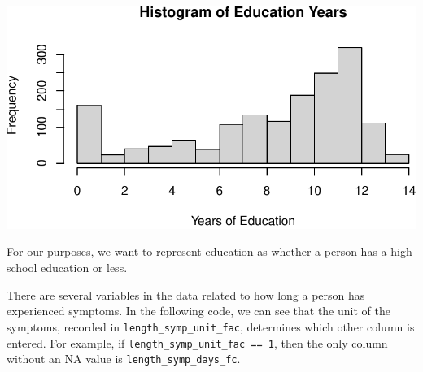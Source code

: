 \documentclass[
  letterpaper,
]{latex/krantz}
\makeatletter
\newenvironment{Shaded}{\begin{snugshade}}{\end{snugshade}}
\newcommand{\CommentTok}[1]{\textcolor[rgb]{0.37,0.37,0.37}{#1}}
\newcommand{\ConstantTok}[1]{\textcolor[rgb]{0.56,0.35,0.01}{#1}}
\newcommand{\DecValTok}[1]{\textcolor[rgb]{0.68,0.00,0.00}{#1}}
\newcommand{\FunctionTok}[1]{\textcolor[rgb]{0.28,0.35,0.67}{#1}}
\newcommand{\NormalTok}[1]{\textcolor[rgb]{0.00,0.23,0.31}{#1}}
\newcommand{\OtherTok}[1]{\textcolor[rgb]{0.00,0.23,0.31}{#1}}
\newcommand{\SpecialCharTok}[1]{\textcolor[rgb]{0.37,0.37,0.37}{#1}}
\newenvironment{kframe}{%
\medskip{}
\setlength{\fboxsep}{.8em}
 \def\at@end@of@kframe{}%
 \ifinner\ifhmode%
  \def\at@end@of@kframe{\end{minipage}}%
  \begin{minipage}{\columnwidth}%
 \fi\fi%
 \def\FrameCommand##1{\hskip\@totalleftmargin \hskip-\fboxsep
 \colorbox{shadecolor}{##1}\hskip-\fboxsep
     \hskip-\linewidth \hskip-\@totalleftmargin \hskip\columnwidth}%
 \MakeFramed {\advance\hsize-\width
   \@totalleftmargin\z@ \linewidth\hsize
   \@setminipage}}%
 {\par\unskip\endMakeFramed%
 \at@end@of@kframe}
\renewenvironment{Shaded}{\begin{kframe}}{\end{kframe}}
\makeatother
\begin{document}
\begin{center}
\includegraphics[width=1\textwidth,height=\textheight]{book/cs_preprocessing_files/figure-pdf/unnamed-chunk-8-1.pdf}
\end{center}

For our purposes, we want to represent education as whether a person has
a high school education or less.

\begin{Shaded}
\end{Shaded}

There are several variables in the data related to how long a person has
experienced symptoms. In the following code, we can see that the unit of
the symptoms, recorded in \texttt{length\_symp\_unit\_fac}, determines
which other column is entered. For example, if
\texttt{length\_symp\_unit\_fac\ ==\ 1}, then the only column without an
NA value is \texttt{length\_symp\_days\_fc}.
\end{document}
